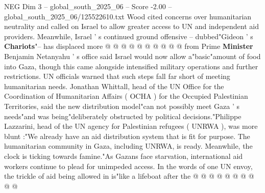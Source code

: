 \begin{textsample}{NEG Dim 3 – global\_south\_2025\_06 – Score -2.00 – global\_south\_2025\_06/125522610.txt}
Wood cited concerns over humanitarian neutrality and called on Israel to allow greater access to UN and independent aid providers.
Meanwhile, Israel ' s continued ground offensive -- dubbed"Gideon ' s \textbf{Chariots}"-- has displaced more @ @ @ @ @ @ @ @ @ @ from Prime \textbf{Minister} Benjamin Netanyahu ' s office said Israel would now allow a"basic"amount of food into Gaza, though this came alongside intensified military operations and further restrictions.
UN officials warned that such steps fall far short of meeting humanitarian needs.
Jonathan Whittall, head of the UN Office for the Coordination of Humanitarian Affairs ( OCHA ) for the Occupied Palestinian Territories, said the new distribution model"can not possibly meet Gaza ' s needs"and was being"deliberately obstructed by political decisions."Philippe Lazzarini, head of the UN agency for Palestinian refugees ( UNRWA ), was more blunt :"We already have an aid distribution system that is fit for purpose.
The humanitarian community in Gaza, including UNRWA, is ready.
Meanwhile, the clock is ticking towards famine."As Gazans face starvation, international aid workers continue to plead for unimpeded access.
In the words of one UN envoy, the trickle of aid being allowed in is"like a lifeboat after the @ @ @ @ @ @ @ @ @ @

\end{textsample}
